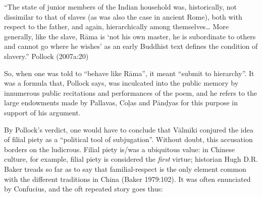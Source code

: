 \begin{myquote}
“The state of junior members of the Indian household was, historically, not dissimilar to that of slaves (as was also the case in ancient Rome), both with respect to the father, and again, hierarchically among themselves… More generally, like the slave, Rāma is ‘not his own master, he is subordinate to others and cannot go where he wishes’ as an early Buddhist text defines the condition of slavery.” 				                                        
\hfill Pollock (2007a:20)
\end{myquote}

So, when one was told to “behave like Rāma”, it meant “submit to hierarchy”. It was a formula that, Pollock says, was inculcated into the public memory by innumerous public recitations and performances of the poem, and he refers to the large endowments made by Pallavas, Coḷas and Pānḍyas for this purpose in support of his argument.

By Pollock’s verdict, one would have to conclude that Vālmīki conjured the idea of filial piety as a “political tool of subjugation”. Without doubt, this accusation borders on the ludicrous. Filial piety is/was a ubiquitous value: in Chinese culture, for example, filial piety is considered the {\sl first} virtue; historian Hugh D.R. Baker treads so far as to say that familial-respect is the only element common with the different traditions in China (Baker 1979:102). It was often enunciated by Confucius, and the oft repeated story goes thus: 

